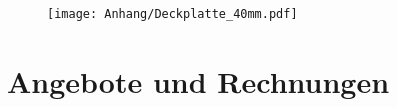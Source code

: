 \begin{figure}  
	\texttt{[image: Anhang/Deckplatte\_40mm.pdf]}
\end{figure}

\clearpage


\section*{Angebote und Rechnungen}








